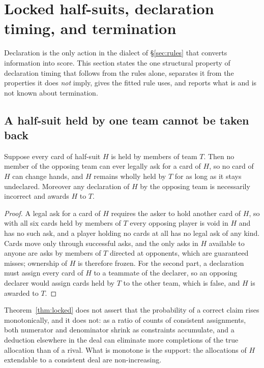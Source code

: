 \section{Locked half-suits, declaration timing, and termination}
\label{sec:locked}

Declaration is the only action in the dialect of \S\ref{sec:rules} that converts
information into score. This section states the one structural property of
declaration timing that follows from the rules alone, separates it from the
properties it does \emph{not} imply, gives the fitted rule \vfast{} uses, and
reports what is and is not known about termination.

\subsection{A half-suit held by one team cannot be taken back}

\begin{theorem}
\label{thm:locked}
Suppose every card of half-suit $H$ is held by members of team $T$. Then no
member of the opposing team can ever legally ask for a card of $H$, so no card of
$H$ can change hands, and $H$ remains wholly held by $T$ for as long as it stays
undeclared. Moreover any declaration of $H$ by the opposing team is necessarily
incorrect and awards $H$ to $T$.
\end{theorem}

\begin{proof}
A legal ask for a card of $H$ requires the asker to hold another card of $H$, so
with all six cards held by members of $T$ every opposing player is void in $H$
and has no such ask, and a player holding no cards at all has no legal ask of any
kind. Cards move only through successful asks, and the only asks in $H$ available
to anyone are asks by members of $T$ directed at opponents, which are guaranteed
misses; ownership of $H$ is therefore frozen. For the second part, a declaration
must assign every card of $H$ to a teammate of the declarer, so an opposing
declarer would assign cards held by $T$ to the other team, which is false, and
$H$ is awarded to $T$.
\end{proof}

Theorem~\ref{thm:locked} does not assert that the probability of a correct claim
rises monotonically, and it does not: as a ratio of counts of consistent
assignments, both numerator and denominator shrink as constraints accumulate, and
a deduction elsewhere in the deal can eliminate more completions of the true
allocation than of a rival. What is monotone is the support: the allocations of
$H$ extendable to a consistent deal are non-increasing.

